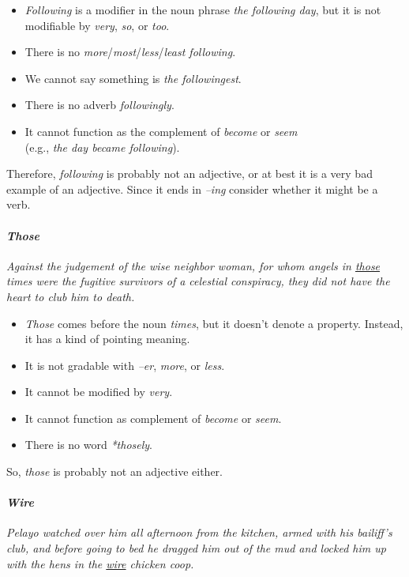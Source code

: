 \begin{itemize}[noitemsep]
    \item \textit{Following} is a modifier in the noun phrase \textit{the following day}, but it is not modifiable by \textit{very}, \textit{so}, or \textit{too}.
    \item There is no \textit{more}/\textit{most}/\textit{less}/\textit{least following}.
    \item We cannot say something is \textit{the followingest}.
    \item There is no adverb \textit{followingly}.
    \item It cannot function as the complement of \textit{become} or \textit{seem} \\(e.g., \textit{the day became following}).
\end{itemize}
Therefore, \textit{following} is probably not an adjective, or at best it is a very bad example of an adjective. Since it ends in \textit{--ing} consider whether it might be a verb.

\paragraph*{\textit{Those}}
\textit{Against the judgement of the wise neighbor woman, for whom angels in \uline{those} times were the fugitive survivors of a celestial conspiracy, they did not have the heart to club him to death.}
\begin{itemize}[noitemsep]
    \item \textit{Those} comes before the noun \textit{times}, but it doesn't denote a property. Instead, it has a kind of pointing meaning.
    \item It is not gradable with \textit{--er}, \textit{more}, or \textit{less}.
    \item It cannot be modified by \textit{very}.
    \item It cannot function as complement of \textit{become} or \textit{seem}.
    \item There is no word \textit{*thosely}.
\end{itemize}
So, \textit{those} is probably not an adjective either.

\paragraph*{\textit{Wire}}
\textit{Pelayo watched over him all afternoon from the kitchen, armed with his bailiff's club, and before going to bed he dragged him out of the mud and locked him up with the hens in the \uline{wire} chicken coop.}

